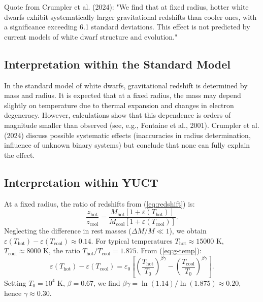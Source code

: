 \documentclass[12pt]{article}
\theoremstyle{remark}
\newcommand{\eps}{\varepsilon}
\begin{document}
	Quote from Crumpler et al. (2024): "We find that at fixed radius, hotter white dwarfs exhibit systematically larger gravitational redshifts than cooler ones, with a significance exceeding 6.1 standard deviations. This effect is not predicted by current models of white dwarf structure and evolution."
	
	\subsection{Interpretation within the Standard Model}
	\label{subsec:wd-standard}
	
	In the standard model of white dwarfs, gravitational redshift is determined by mass and radius. It is expected that at a fixed radius, the mass may depend slightly on temperature due to thermal expansion and changes in electron degeneracy. However, calculations show that this dependence is orders of magnitude smaller than observed (see, e.g., Fontaine et al., 2001). Crumpler et al. (2024) discuss possible systematic effects (inaccuracies in radius determination, influence of unknown binary systems) but conclude that none can fully explain the effect.
	
	\subsection{Interpretation within YUCT}
	\label{subsec:wd-yuct}
	
	At a fixed radius, the ratio of redshifts from (\ref{eq:redshift}) is:
	\begin{equation}
		\frac{z_{\text{hot}}}{z_{\text{cool}}} = \frac{M_{\text{hot}}[1+\eps(T_{\text{hot}})]}{M_{\text{cool}}[1+\eps(T_{\text{cool}})]}.
		\label{eq:redshift-ratio}
	\end{equation}
	Neglecting the difference in rest masses ($\Delta M/M \ll 1$), we obtain $\eps(T_{\text{hot}}) - \eps(T_{\text{cool}}) \approx 0.14$. For typical temperatures $T_{\text{hot}} \approx 15000$ K, $T_{\text{cool}} \approx 8000$ K, the ratio $T_{\text{hot}}/T_{\text{cool}} = 1.875$. From (\ref{eq:g-temp}):
	\begin{equation}
		\eps(T_{\text{hot}}) - \eps(T_{\text{cool}}) = \eps_0 \left[ \left( \frac{T_{\text{hot}}}{T_0} \right)^{\beta\gamma} - \left( \frac{T_{\text{cool}}}{T_0} \right)^{\beta\gamma} \right].
		\label{eq:eps-diff}
	\end{equation}
	Setting $T_0 = 10^4$ K, $\beta = 0.67$, we find $\beta\gamma = \ln(1.14) / \ln(1.875) \approx 0.20$, hence $\gamma \approx 0.30$. 
	
\end{document}
